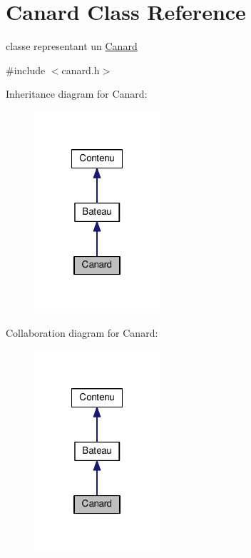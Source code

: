 \hypertarget{classCanard}{\section{Canard Class Reference}
\label{classCanard}
}


classe representant un \hyperlink{classCanard}{Canard}  




{\ttfamily \#include $<$canard.\+h$>$}



Inheritance diagram for Canard\+:
\nopagebreak
\begin{figure}[H]
\begin{center}
\leavevmode
\includegraphics[width=132pt]{classCanard__inherit__graph}
\end{center}
\end{figure}


Collaboration diagram for Canard\+:
\nopagebreak
\begin{figure}[H]
\begin{center}
\leavevmode
\includegraphics[width=132pt]{classCanard__coll__graph}
\end{center}
\end{figure}
